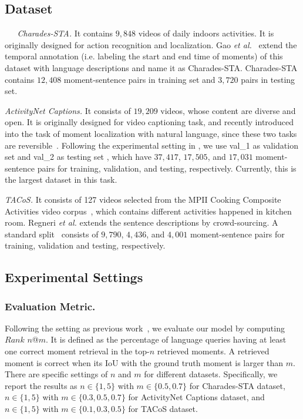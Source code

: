\documentclass[letterpaper]{article} %
\begin{document}
\subsection{Dataset}

\textit{~~~Charades-STA.}
It contains $9,848$ videos of daily indoors activities. It is originally designed for action recognition and localization. Gao \textit{et al.}~\cite{gao2017tall} extend the temporal annotation (i.e. labeling the start and end time of moments) of this dataset with language descriptions and name it as Charades-STA. Charades-STA contains $12,408$ moment-sentence pairs in training set and $3,720$ pairs in testing set.


\textit{ActivityNet Captions.} It consists of $19,209$  videos, whose content are diverse and open.
It is originally designed for video captioning task, and recently introduced into the task of moment localization with natural language, since these two tasks are reversible~\cite{chen2018temporally,zhang2019cross}.
Following the experimental setting in \cite{zhang2019cross}, we use val\_1 as validation set and val\_2 as testing set , which have $37,417$, $17,505$, and $17,031$ moment-sentence pairs for training, validation, and testing, respectively. Currently, this is the largest dataset in this task.

\textit{TACoS.}
It consists of 127 videos selected from the MPII Cooking Composite Activities video corpus~\cite{rohrbach2012script}, which contains different activities happened in kitchen room.
Regneri \textit{et al.} extends the sentence descriptions by crowd-sourcing.
A standard split~\cite{gao2017tall} consists of $9,790$, $4,436$, and $4,001$ moment-sentence pairs for training, validation and testing, respectively.

\subsection{Experimental Settings}

\subsubsection{Evaluation Metric.}
Following the setting as previous work~\cite{gao2017tall}, we evaluate our model by computing $Rank$ $n$@$m$. It is defined as the percentage of language queries having at least one correct moment retrieval in the top-$n$ retrieved moments. A retrieved moment is correct when its IoU with the ground truth moment is larger than $m$.
There are specific settings of $n$ and $m$ for different datasets. Specifically,
we report the results as $n\in\{1, 5\}$ with $m\in\{0.5,0.7\}$ for Charades-STA dataset, $n\in\{1, 5\}$ with $m\in\{0.3,0.5,0.7\}$ for ActivityNet Captions dataset, and $n\in\{1, 5\}$ with $m\in\{0.1,0.3,0.5\}$ for TACoS dataset.
\end{document}
